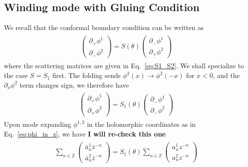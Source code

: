 \subsection{Winding mode with Gluing Condition}
\label{app_sub:compact_gluing_boundary}
We recall that the conformal boundary condition can be written as
\begin{eqnarray}\begin{aligned}
\label{eq:def_S_in_app}
\begin{pmatrix}
\partial_+\phi^1\\
\partial_-\phi^2
\end{pmatrix}
=S(\theta)
\begin{pmatrix}
\partial_-\phi^1\\
\partial_+\phi^2
\end{pmatrix}
\end{aligned}\end{eqnarray}
where the scattering matrices are given in Eq.~\eqref{eq:S1_S2}. We shall specialize to the case $S=S_1$ first. The folding sends $\phi^2(x)\rightarrow\phi^2(-x)$ for $x<0$, and the $\partial_x\phi^2$ term changes sign, we therefore have 
\begin{eqnarray}\begin{aligned}
\label{eq:def_S_in_app_2}
\begin{pmatrix}
\partial_+\phi^1\\
\partial_+\phi^2
\end{pmatrix}
=S_1(\theta)
\begin{pmatrix}
\partial_-\phi^1\\
\partial_-\phi^2
\end{pmatrix}
\end{aligned}\end{eqnarray}
Upon mode expanding $\phi^{1,2}$ in the holomorphic coordinates as in Eq.~\eqref{eq:phi_in_z}, we have{\bf\color{red} I will re-check this one}
\begin{eqnarray}\begin{aligned}
\label{eq:def_S_in_app_2}
\sum_{n\in\mathbb{Z}}\begin{pmatrix}
\bar{a}_n^1\bar{z}^{-n}\\
\bar{a}_n^2\bar{z}^{-n}
\end{pmatrix}
=S_1(\theta)
\sum_{n\in\mathbb{Z}}
\begin{pmatrix}
a_n^1{z}^{-n}\\
a_n^2{z}^{-n}
\end{pmatrix}
\end{aligned}\end{eqnarray}
